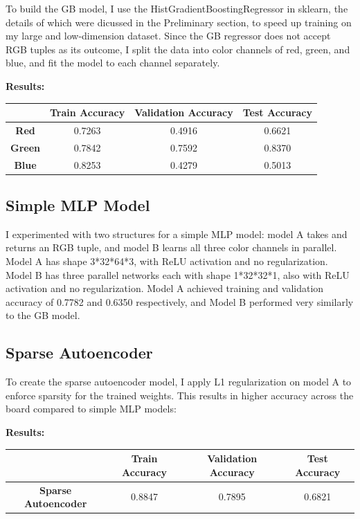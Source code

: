 \documentclass[twoside,11pt]{article}
\begin{document}
To build the GB model, I use the HistGradientBoostingRegressor in sklearn, the details of which were dicussed in the Preliminary section, 
to speed up training on my large and low-dimension dataset. Since the GB regressor does not accept RGB tuples as its outcome, I split the data into color channels of 
red, green, and blue, and fit the model to each channel separately.

\textbf{Results:}
\begin{center}
	\begin{tabular}{ c|c|c|c }
	 &  \textbf{Train Accuracy}& \textbf{Validation Accuracy} & \textbf{Test Accuracy} \\
	 \hline
	 \textbf{Red} & 0.7263 & 0.4916 & 0.6621 \\  
	 \hline
	 \textbf{Green} & 0.7842 & 0.7592 & 0.8370 \\
	 \hline
	 \textbf{Blue}& 0.8253 & 0.4279 & 0.5013 \\
	\end{tabular}
	\end{center}

\subsection{Simple MLP Model}
I experimented with two structures for a simple MLP model: model A takes and returns an RGB tuple, and model B learns all 
three color channels in parallel. Model A has shape 3*32*64*3, with ReLU activation and no regularization. 
Model B has three parallel networks each with shape 1*32*32*1, also with ReLU activation and no regularization.
Model A achieved training and validation accuracy of 0.7782 and 0.6350 respectively, and Model B performed very similarly to the GB model.

\subsection{Sparse Autoencoder}
To create the sparse autoencoder model, I apply L1 regularization on model A to enforce sparsity for the trained weights. 
This results in higher accuracy across the board compared to simple MLP models:

\textbf{Results:}
\begin{center}
	\begin{tabular}{ c|c|c|c }
	 &  \textbf{Train Accuracy}& \textbf{Validation Accuracy} & \textbf{Test Accuracy} \\
	 \hline
	 \textbf{Sparse Autoencoder} & 0.8847 & 0.7895 & 0.6821 \\  
	\end{tabular}
	\end{center}
\end{document}
